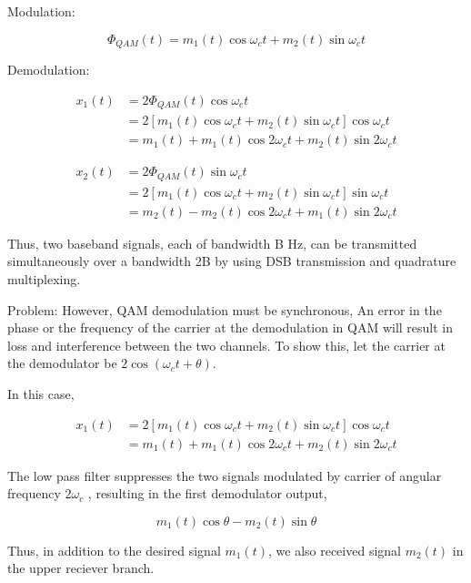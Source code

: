 Modulation:

\begin{equation}
	\varPhi_{QAM}(t)=m_1(t)\cos{\omega_ct}+m_2(t)\sin{\omega_ct}
\end{equation}

Demodulation:

\begin{equation}
	\begin{split}
	x_1(t) & =2\varPhi_{QAM}(t)\cos{\omega_ct}\\
	& = 2[m_1(t)\cos{\omega_ct}+m_2(t)\sin{\omega_ct}]\cos{\omega_ct}\\
	& = m_1(t)+ m_1(t)\cos{2\omega_ct}+m_2(t) \sin{2\omega_ct}
	\end{split}
\end{equation}

\begin{equation}
	\begin{split}
	x_2(t) & =2\varPhi_{QAM}(t)\sin{\omega_ct}\\
	& = 2[m_1(t)\cos{\omega_ct}+m_2(t)\sin{\omega_ct}]\sin{\omega_ct}\\
	& = m_2(t)- m_2(t)\cos{2\omega_ct}+m_1(t) \sin{2\omega_ct}
	\end{split}
\end{equation}

Thus, two baseband signals, each of bandwidth B Hz, can be transmitted simultaneously over a bandwidth 2B by using DSB transmission and quadrature multiplexing.

Problem: However, QAM demodulation must be synchronous, An error in the phase or the
frequency of the carrier at the demodulation in QAM will result in loss and interference between the two channels. To show this, let the carrier at the demodulator be $2\cos{(\omega_ct+\theta)}$.

In this case,

\begin{equation}
\begin{split}
x_1(t) & = 2[m_1(t)\cos{\omega_ct}+m_2(t)\sin{\omega_ct}]\cos{\omega_ct}\\
& = m_1(t)+ m_1(t)\cos{2\omega_ct}+m_2(t) \sin{2\omega_ct}
\end{split}
\end{equation}

The low pass filter suppresses the two signals modulated by carrier of angular frequency $2\omega_c$ , resulting in the first demodulator output,

\begin{equation}
	m_1(t)\cos{\theta}-m_2(t)\sin{\theta}
\end{equation}

Thus, in addition to the desired signal $m_1(t)$, we also received signal $m_2(t)$ in the upper reciever branch.



